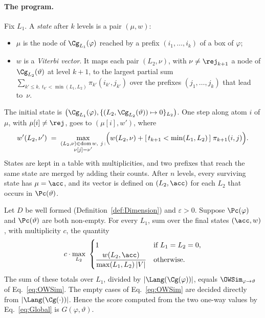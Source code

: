 \paragraph{The program.}
Fix $L_1$. A \emph{state} after $k$ levels is a pair $(\mu, w)$:
\begin{itemize}
  \item $\mu$ is the node of $\Cg_{L_1}(\varphi)$ reached by a prefix
    $(i_1,\dots,i_k)$ of a box of $\varphi$;
  \item $w$ is a \emph{Viterbi vector}. It maps each pair $(L_2,\nu)$, with
    $\nu\neq\rej_{k+1}$ a node of $\Cg_{L_2}(\vartheta)$ at level $k+1$, to the
    largest partial sum $\sum_{k'\le k,\ t_{k'}<\min(L_1,L_2)}\pi_{k'}(i_{k'},j_{k'})$
    over the prefixes $(j_1,\dots,j_k)$ that lead to~$\nu$.
\end{itemize}
The initial state is $\bigl(\Cg_{L_1}(\varphi), \{(L_2,\Cg_{L_2}(\vartheta))\mapsto 0\}_{L_2}\bigr)$.
One step along atom $i$ of $\mu$, with $\mu[i]\neq\rej$, goes to
$(\mu[i],w')$, where
\begin{equation}\label{eq:viterbi}
  w'(L_2,\nu') \;=\; \max_{\substack{(L_2,\nu)\in\mathrm{dom}\,w,\ j\,:\\ \nu[j]=\nu'}}
  \Bigl(w(L_2,\nu) + [\,t_{k+1}<\min(L_1,L_2)\,]\;\pi_{k+1}(i,j)\Bigr).
\end{equation}
States are kept in a table with multiplicities, and two prefixes that reach the
same state are merged by adding their counts. After $n$ levels, every
surviving state has $\mu=\acc$, and its vector is defined on $(L_2,\acc)$ for
each $L_2$ that occurs in $\Pc(\vartheta)$.

\begin{theorem}[compatibility]\label{thm:compat}
Let $D$ be well formed (Definition~\ref{def:Dimension}) and $\varepsilon>0$.
Suppose $\Pc(\varphi)$ and $\Pc(\vartheta)$ are both non-empty. For every $L_1$,
sum over the final states $(\acc,w)$, with multiplicity $c$, the quantity
\[
  c\cdot\max_{L_2}\ \begin{cases}1 & \text{if } L_1=L_2=0,\\[2pt]
  \dfrac{w(L_2,\acc)}{\max(L_1,L_2)\,|V|} & \text{otherwise.}\end{cases}
\]
The sum of these totals over $L_1$, divided by $|\Lang(\Cg(\varphi))|$, equals
$\OWSim_{\varphi\to\vartheta}$ of Eq.~\eqref{eq:OWSim}. The empty cases of
Eq.~\eqref{eq:OWSim} are decided directly from $|\Lang(\Cg(\cdot))|$. Hence
the score computed from the two one-way values by Eq.~\eqref{eq:Global} is
$G(\varphi,\vartheta)$.
\end{theorem}

